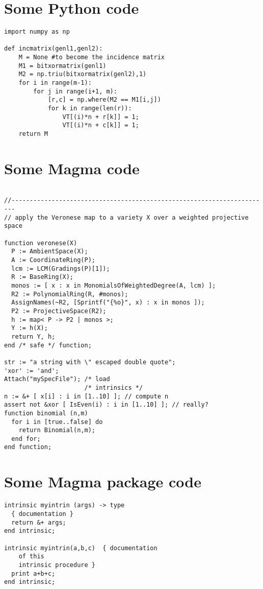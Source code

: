 \documentclass{article}
\begin{document}
\section*{Some Python code}
\begin{verbatim}
import numpy as np

def incmatrix(genl1,genl2):
    M = None #to become the incidence matrix
    M1 = bitxormatrix(genl1)
    M2 = np.triu(bitxormatrix(genl2),1)
    for i in range(m-1):
        for j in range(i+1, m):
            [r,c] = np.where(M2 == M1[i,j])
            for k in range(len(r)):
                VT[(i)*n + r[k]] = 1;
                VT[(i)*n + c[k]] = 1;
    return M
\end{verbatim}

\section*{Some Magma code}

\begin{verbatim}

//-----------------------------------------------------------------------
// apply the Veronese map to a variety X over a weighted projective space

function veronese(X)
  P := AmbientSpace(X);
  A := CoordinateRing(P);
  lcm := LCM(Gradings(P)[1]);
  R := BaseRing(X);
  monos := [ x : x in MonomialsOfWeightedDegree(A, lcm) ];
  R2 := PolynomialRing(R, #monos);
  AssignNames(~R2, [Sprintf("{%o}", x) : x in monos ]);
  P2 := ProjectiveSpace(R2);
  h := map< P -> P2 | monos >;
  Y := h(X);
  return Y, h;
end /* safe */ function;

str := "a string with \" escaped double quote";
'xor' := 'and';
Attach("mySpecFile"); /* load
                      /* intrinsics */
n := &+ [ x[i] : i in [1..10] ]; // compute n
assert not &xor [ IsEven(i) : i in [1..10] ]; // really?
function binomial (n,m)
  for i in [true..false] do
    return Binomial(n,m);
  end for;
end function;
\end{verbatim}


\section*{Some Magma package code}
\begin{verbatim}
intrinsic myintrin (args) -> type
  { documentation }
  return &+ args;
end intrinsic;

intrinsic myintrin(a,b,c)  { documentation
    of this
    intrinsic procedure }
  print a+b+c;
end intrinsic;
\end{verbatim}
\end{document}

